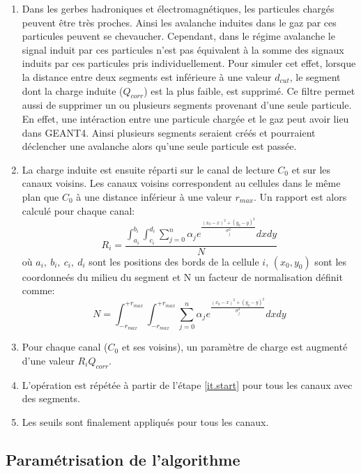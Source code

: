 \begin{enumerate}[~~1-]
\item Dans les gerbes hadroniques et électromagnétiques, les particules chargés peuvent être très proches. Ainsi les avalanche induites dans le gaz par ces particules peuvent se chevaucher. Cependant, dans le régime avalanche le signal induit par ces particules n'est pas équivalent à la somme des signaux induits par ces particules pris individuellement. Pour simuler cet effet, lorsque la distance entre deux segments est inférieure à une valeur $d_{cut}$, le segment dont la charge induite ($Q_{corr}$) est la plus faible, est supprimé. Ce filtre permet aussi de supprimer un ou plusieurs segments provenant d'une seule particule. En effet, une intéraction entre une particule chargée et le gaz peut avoir lieu dans GEANT4. Ainsi plusieurs segments seraient créés et pourraient déclencher une avalanche alors qu'une seule particule est passée.
\item La charge induite est ensuite réparti sur le canal de lecture $C_0$  et sur les canaux voisins. Les canaux voisins correspondent au cellules dans le même plan que $C_0$ à une distance inférieur à une valeur $r_{max}$. Un rapport est alors calculé pour chaque canal:
  \begin{equation}
    \label{eq.ratio}
    R_i = \frac{\int_{a_i}^{b_i}\int_{c_i}^{d_i}\sum_{j=0}^{n}\alpha_j e^{ \frac{(x_0-x)^2+(y_0-y)^2}{\sigma_j^2}}dxdy}{N}
  \end{equation}
  où $a_i,\ b_i,\ c_i,\ d_i$ sont les positions des bords de la cellule $i$, $(x_0,y_0)$ sont les coordonneés du milieu du segment et N un facteur de normalisation définit comme: 
  \begin{equation}
    \label{eq.norm}
    N=\int_{-r_{max}}^{+r_{max}}\int_{-r_{max}}^{+r_{max}}\sum_{j=0}^{n}\alpha_j e^{ \frac{(x_0-x)^2+(y_0-y)^2}{\sigma_j^2}}dxdy
  \end{equation}
\item Pour chaque canal ($C_0$ et ses voisins), un paramètre de charge est augmenté d'une valeur $R_iQ_{corr}$.
\item L'opération est répétée à partir de l'étape \ref{it.start} pour tous les canaux avec des segments.
\item Les seuils sont finalement appliqués pour tous les canaux.
\end{enumerate}


\subsection{Paramétrisation de l'algorithme}
\label{sec.param}

